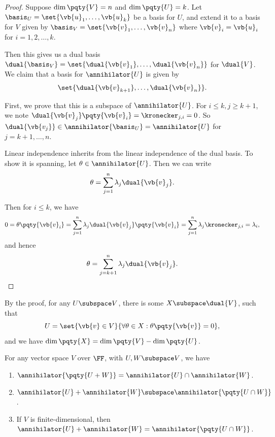 \begin{proof}
    Suppose \(\dim\pqty{V} = n\) and \(\dim\pqty{U} = k\). Let \(\basis_U = \set{\vb{u}_1, \ldots, \vb{u}_k}\) be a basis for \(U\), and extend it to a basis for \(V\) given by \(\basis_{V} = \set{\vb{v}_1, \ldots, \vb{v}_n}\) where \(\vb{v}_i = \vb{u}_i\) for \(i = 1, 2, \ldots, k\).

    Then this gives us a dual basis \(\dual{\basis_V} = \set{\dual{\vb{v}_1}, \ldots, \dual{\vb{v}_n}}\) for \(\dual{V}\). We claim that a basis for \(\annihilator{U}\) is given by
    \[
        \set{\dual{\vb{v}_{k+1}}, \ldots, \dual{\vb{v}_n}}.
    \]

    First, we prove that this is a subspace of \(\annihilator{U}\). For \(i \leq k, j \geq k + 1\), we note \(\dual{\vb{v}_j} \pqty{\vb{v}_i} = \kronecker_{j, i} = 0\). So \(\dual{\vb{v_j}} \in \annihilator{\basis_U} = \annihilator{U}\) for \(j = k + 1, \ldots, n\).

    Linear independence inherits from the linear independence of the dual basis. To show it is spanning, let \(\theta \in \annihilator{U}\). Then we can write
    \[
        \theta = \sum_{j = 1}^n \lambda_j \dual{\vb{v}_j}.
    \]

    Then for \(i \leq k\), we have
    \[
        0 = \theta\pqty{\vb{v}_i} = \sum_{j = 1}^{n} \lambda_j \dual{\vb{v}_j}\pqty{\vb{v}_i} = \sum_{j = 1}^{n} \lambda_j \kronecker_{j, i} = \lambda_i,
    \]
    and hence
    \[
        \theta = \sum_{j = k + 1}^{n} \lambda_j \dual{\vb{v}_j}.
    \]
\end{proof}

\begin{remark}
    By the proof, for any \(U \subspace V\), there is some \(X \subspace \dual{V}\), such that
    \[
        U = \set{\vb{v} \in V}{\forall \theta \in X: \theta\pqty{\vb{v}} = 0},
    \]
    and we have \(\dim \pqty{X} = \dim \pqty{V} - \dim \pqty{U}\).
\end{remark}

\begin{proposition}
    \label{prop:annihilator-of-sum-and-intersection}%
    For any vector space \(V\) over \(\FF\), with \(U, W \subspace V\), we have
    \begin{enumerate}[label=(\roman*)]
        \item \(\annihilator{\pqty{U + W}} = \annihilator{U} \cap \annihilator{W}\).
        \item \(\annihilator{U} + \annihilator{W} \subspace \annihilator{\pqty{U \cap W}}\).
        \item If \(V\) is finite-dimensional, then \(\annihilator{U} + \annihilator{W} = \annihilator{\pqty{U \cap W}}\).
    \end{enumerate}
\end{proposition}

